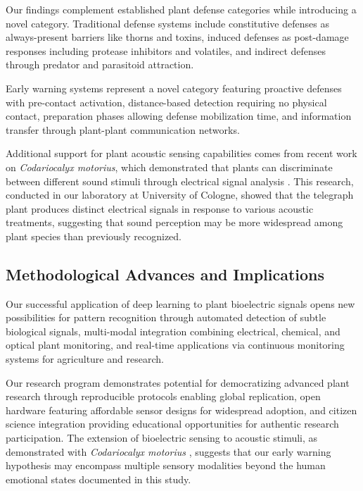 \documentclass{article}
\begin{document}
Our findings complement established plant defense categories while introducing a novel category. Traditional defense systems include constitutive defenses as always-present barriers like thorns and toxins, induced defenses as post-damage responses including protease inhibitors and volatiles, and indirect defenses through predator and parasitoid attraction.

Early warning systems represent a novel category featuring proactive defenses with pre-contact activation, distance-based detection requiring no physical contact, preparation phases allowing defense mobilization time, and information transfer through plant-plant communication networks.

Additional support for plant acoustic sensing capabilities comes from recent work on \textit{Codariocalyx motorius}, which demonstrated that plants can discriminate between different sound stimuli through electrical signal analysis \cite{peter2021plants}. This research, conducted in our laboratory at University of Cologne, showed that the telegraph plant produces distinct electrical signals in response to various acoustic treatments, suggesting that sound perception may be more widespread among plant species than previously recognized.

\subsection{Methodological Advances and Implications}

Our successful application of deep learning to plant bioelectric signals opens new possibilities for pattern recognition through automated detection of subtle biological signals, multi-modal integration combining electrical, chemical, and optical plant monitoring, and real-time applications via continuous monitoring systems for agriculture and research.

Our research program demonstrates potential for democratizing advanced plant research through reproducible protocols enabling global replication, open hardware featuring affordable sensor designs for widespread adoption, and citizen science integration providing educational opportunities for authentic research participation. The extension of bioelectric sensing to acoustic stimuli, as demonstrated with \textit{Codariocalyx motorius} \cite{peter2021plants}, suggests that our early warning hypothesis may encompass multiple sensory modalities beyond the human emotional states documented in this study.
\end{document}
